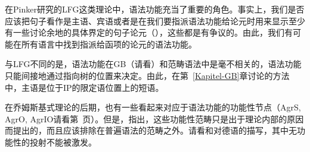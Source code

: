 在Pinker研究的LFG\indexlfg{}这类理论中，语法功能充当了重要的角色。事实上，我们是否应该把句子看作是主语、宾语或者是在我们要指派语法功能给论元时用来显示至少有一些讨论余地的具体界定的句子论元（\xcomp ）\citep*{DL2000a-u,Berman2003a-u,Berman2007a-u,AMM2005a-u,Forst2006a-u}，这些都是有争议的。由此，我们有可能在所有语言中找到指派给函项的论元的语法功能。

与LFG不同的是，语法功能在GB（请看\citealp{Williams84a,Sternefeld85a}）和范畴语法\indexcg 中是毫不相关的，语法功能只能间接地通过指向树的位置来决定。由此，在第~\ref{Kapitel-GB}章讨论的方法中，主语是位于IP的限定语位置上的短语。

在乔姆斯基式理论的后期，也有一些看起来对应于语法功能的功能性节点（AgrS,
AgrO, AgrIO请看第~\pageref{Seite-AgrO}页）。但是，\citet[Section~4.10.1]{Chomsky95a-u}指出，这些功能性范畴只是出于理论内部的原因而提出的，而且应该排除在普遍语法的范畴之外。请看和对德语的描写，其中无功能性的投射不能被激发。

